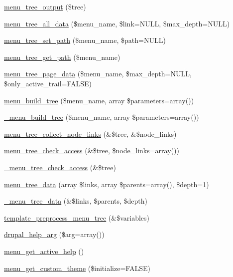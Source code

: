 \begin{DoxyCompactItemize}
\item 
\hyperlink{group__menu_ga2ef0691992a9df71eb3455ba774053e7}{menu\_\-tree\_\-output} (\$tree)
\item 
\hyperlink{group__menu_ga4f06528e6ed613b6a885e051035b322a}{menu\_\-tree\_\-all\_\-data} (\$menu\_\-name, \$link=NULL, \$max\_\-depth=NULL)
\item 
\hyperlink{group__menu_gacbb655f92275e3c823637edbd9441cdd}{menu\_\-tree\_\-set\_\-path} (\$menu\_\-name, \$path=NULL)
\item 
\hyperlink{group__menu_ga719b18e6d93314528b8726b333f300c0}{menu\_\-tree\_\-get\_\-path} (\$menu\_\-name)
\item 
\hyperlink{group__menu_ga58b0372b3340be5d070d4ca8bf5a7af8}{menu\_\-tree\_\-page\_\-data} (\$menu\_\-name, \$max\_\-depth=NULL, \$only\_\-active\_\-trail=FALSE)
\item 
\hyperlink{group__menu_gabd17638ed8a36d5412244fd7c2456eb7}{menu\_\-build\_\-tree} (\$menu\_\-name, array \$parameters=array())
\item 
\hyperlink{group__menu_ga036009a003a68a01a420737d9c1b30c0}{\_\-menu\_\-build\_\-tree} (\$menu\_\-name, array \$parameters=array())
\item 
\hyperlink{group__menu_ga0c9a63fbbdf8496828f1f80d37459475}{menu\_\-tree\_\-collect\_\-node\_\-links} (\&\$tree, \&\$node\_\-links)
\item 
\hyperlink{group__menu_ga6374db210d96026fb70431def083a7a5}{menu\_\-tree\_\-check\_\-access} (\&\$tree, \$node\_\-links=array())
\item 
\hyperlink{group__menu_gad59ba7ae64f452408201f82f8cb7dc25}{\_\-menu\_\-tree\_\-check\_\-access} (\&\$tree)
\item 
\hyperlink{group__menu_ga80a5defa3498d4e60321af746c1104c3}{menu\_\-tree\_\-data} (array \$links, array \$parents=array(), \$depth=1)
\item 
\hyperlink{group__menu_gaf179327ae18d3a8ace0453b528707e3e}{\_\-menu\_\-tree\_\-data} (\&\$links, \$parents, \$depth)
\item 
\hyperlink{group__menu_ga3b3b2907371200b81f18bfaed7538855}{template\_\-preprocess\_\-menu\_\-tree} (\&\$variables)
\item 
\hyperlink{group__menu_ga00dce79e81030a75c94c7a279794b253}{drupal\_\-help\_\-arg} (\$arg=array())
\item 
\hyperlink{group__menu_ga21c6572391132f4e1f5b3fd108220bf4}{menu\_\-get\_\-active\_\-help} ()
\item 
\hyperlink{group__menu_gaf00aa2604e9ad7c0ff0faa6cbc301da8}{menu\_\-get\_\-custom\_\-theme} (\$initialize=FALSE)

\end{DoxyCompactItemize}
